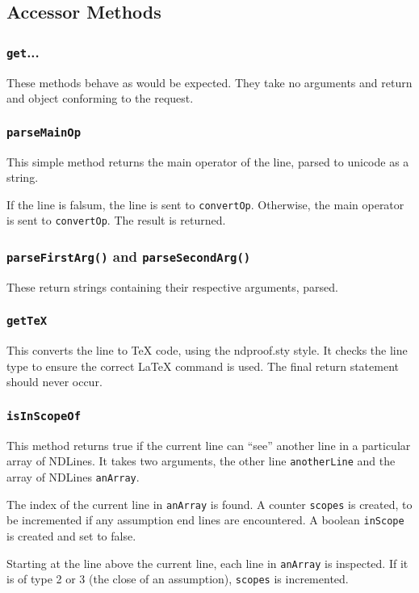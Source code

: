 \documentclass[a4paper]{article}
\begin{document}
\subsection{Accessor Methods}

\subsubsection{\texttt{get}...}
These methods behave as would be expected. They take no arguments and return and object conforming to the request.

\subsubsection{\texttt{parseMainOp}}
This simple method returns the main operator of the line, parsed to unicode as a string.

If the line is falsum, the line is sent to \texttt{convertOp}. Otherwise, the main operator is sent to \texttt{convertOp}. The result is returned.


\subsubsection{\texttt{parseFirstArg()} and \texttt{parseSecondArg()}}
These return strings containing their respective arguments, parsed.

\subsubsection{\texttt{getTeX}}
This converts the line to TeX code, using the ndproof.sty style. It checks the line type to ensure the correct LaTeX command is used. The final return statement should never occur.

\subsubsection{\texttt{isInScopeOf}}
This method returns true if the current line can ``see'' another line in a particular array of NDLines. It takes two arguments, the other line \texttt{anotherLine} and the array of NDLines \texttt{anArray}.

The index of the current line in \texttt{anArray} is found. A counter \texttt{scopes} is created, to be incremented if any assumption end lines are encountered. A boolean \texttt{inScope} is created and set to false.

Starting at the line above the current line, each line in \texttt{anArray} is inspected. If it is of type 2 or 3 (the close of an assumption), \texttt{scopes} is incremented. 
\end{document}
